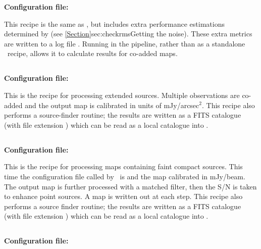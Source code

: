 \textbf{Configuration file: }

This recipe is the same as , but includes extra
performance estimations determined by 
(see \cref{Section}{sec:checkrms}{Getting the noise}). These extra
metrics are written to a log file . Running
 in the pipeline, rather than as a
standalone \picard\ recipe, allows it to calculate results for
co-added maps.


\subsection{}

\textbf{Configuration file: }

This is the recipe for processing extended sources. Multiple
observations are co-added and the output map is calibrated in units of
mJy/arcsec$^2$. This recipe also performs a source-finder routine; the
results are written as a FITS catalogue (with file extension
) which can be read as a local catalogue into \gaia.

\subsection{}

\textbf{Configuration file: }

This is the recipe for processing maps containing faint compact
sources. This time the configuration file called by \makemap\ is
 and the map calibrated in
mJy/beam.  The output map is further processed with a matched filter,
then the S/N is taken to enhance point sources.  A map is written out
at each step.  This recipe also performs a source finder routine; the
results are written as a FITS catalogue (with file extension
) which can be read as a local catalogue into \gaia.


\subsection{}

\textbf{Configuration file: }

